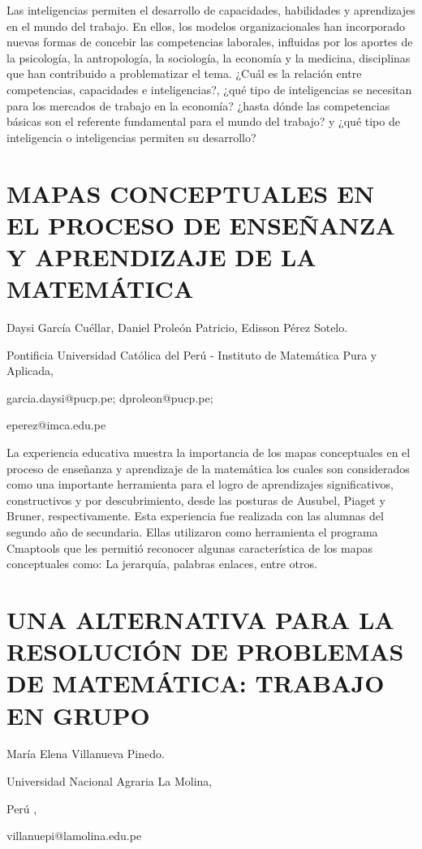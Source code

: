 Las inteligencias permiten el desarrollo de capacidades, habilidades
y aprendizajes en el mundo del trabajo. En ellos, los modelos organizacionales
han incorporado nuevas formas de concebir las competencias laborales,
influidas por los aportes de la psicología, la antropología, la sociología,
la economía y la medicina, disciplinas que han contribuido a problematizar
el tema. ¿Cuál es la relación entre competencias, capacidades e inteligencias?,
¿qué tipo de inteligencias se necesitan para los mercados de trabajo
en la economía? ¿hasta dónde las competencias básicas son el referente
fundamental para el mundo del trabajo? y ¿qué tipo de inteligencia
o inteligencias permiten su desarrollo? 


\section{MAPAS CONCEPTUALES EN EL PROCESO DE ENSEÑANZA Y APRENDIZAJE DE LA
MATEMÁTICA}

\begin{datos}

Daysi García Cuéllar, Daniel Proleón Patricio, Edisson Pérez Sotelo.

Pontificia Universidad Católica del Perú - Instituto de Matemática
Pura y Aplicada,

garcia.daysi@pucp.pe; dproleon@pucp.pe; 

eperez@imca.edu.pe

\end{datos}

La experiencia educativa muestra la importancia de los mapas conceptuales
en el proceso de enseñanza y aprendizaje de la matemática los cuales
son considerados como una importante herramienta para el logro de
aprendizajes significativos, constructivos y por descubrimiento, desde
las posturas de Ausubel, Piaget y Bruner, respectivamente. Esta experiencia
fue realizada con las alumnas del segundo año de secundaria. Ellas
utilizaron como herramienta el programa Cmaptools que les permitió
reconocer algunas característica de los mapas conceptuales como: La
jerarquía, palabras enlaces, entre otros.


\section{UNA ALTERNATIVA PARA LA RESOLUCIÓN DE PROBLEMAS DE MATEMÁTICA: TRABAJO
EN GRUPO}

\begin{datos}María Elena Villanueva Pinedo.

Universidad Nacional Agraria La Molina,

Perú ,

villanuepi@lamolina.edu.pe

\end{datos}

